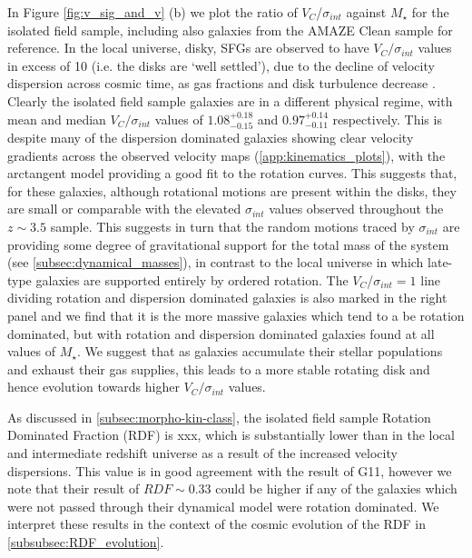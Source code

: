 \documentclass[fleqn,usenatbib]{mn2e}
\begin{document}
In Figure \ref{fig:v_sig_and_v} (b) we plot the ratio of $V_{C}$/$\sigma_{int}$ against $M_{\star}$ for the isolated field sample, including also galaxies from the AMAZE Clean sample for reference.
In the local universe, disky, SFGs are observed to have $V_{C}/\sigma_{int}$ values in excess of 10 (i.e. the disks are `well settled'), due to the decline of velocity dispersion across cosmic time, as gas fractions and disk turbulence decrease \citep[e.g.][]{Epinat2008,Epinat2008a}.
Clearly the isolated field sample galaxies are in a different physical regime, with mean and median $V_{C}/\sigma_{int}$ values of $1.08^{+0.18}_{-0.15}$ and $0.97^{+0.14}_{-0.11}$ respectively.
This is despite many of the dispersion dominated galaxies showing clear velocity gradients across the observed velocity maps (\cref{app:kinematics_plots}), with the arctangent model providing a good fit to the rotation curves.
This suggests that, for these galaxies, although rotational motions are present within the disks, they are small or comparable with the elevated $\sigma_{int}$ values observed throughout the $z \sim 3.5$ sample.
This suggests in turn that the random motions traced by $\sigma_{int}$ are providing some degree of gravitational support for the total mass of the system (see \cref{subsec:dynamical_masses}), in contrast to the local universe in which late-type galaxies are supported entirely by ordered rotation.
The $V_{C}$/$\sigma_{int}=1$ line dividing rotation and dispersion dominated galaxies is also marked in the right panel and we find that it is the more massive galaxies which tend to a be rotation dominated, but with rotation and dispersion dominated galaxies found at all values of $M_{\star}$.
We suggest that as galaxies accumulate their stellar populations and exhaust their gas supplies, this leads to a more stable rotating disk and hence evolution towards higher $V_{C}/\sigma_{int}$ values.


As discussed in \cref{subsec:morpho-kin-class}, the isolated field sample Rotation Dominated Fraction (RDF) is xxx, which is substantially lower than in the local and intermediate redshift universe as a result of the increased velocity dispersions.
This value is in good agreement with the result of G11, however we note that their result of $RDF \sim 0.33$ could be higher if any of the galaxies which were not passed through their dynamical model were rotation dominated.
We interpret these results in the context of the cosmic evolution of the RDF in \cref{subsubsec:RDF_evolution}.\\
\end{document}
